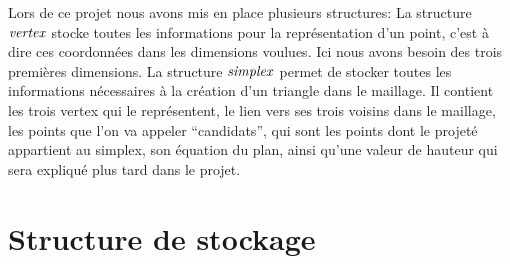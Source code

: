 \documentclass[10pt,a4paper]{report}
\begin{document}
\hspace*{10mm}Lors de ce projet nous avons mis en place plusieurs structures:
\newline\newline
\hspace*{10mm}La structure $\it{vertex}$ stocke toutes les informations pour la représentation d'un point, c'est à dire ces coordonnées dans les dimensions voulues. Ici nous avons besoin des trois premières dimensions.
\newline \newline
\hspace*{10mm}La structure $\it{simplex}$ permet de stocker toutes les informations nécessaires à la création d'un triangle dans le maillage. Il contient les trois vertex qui le représentent, le lien vers ses trois voisins dans le maillage, les points que l'on va appeler “candidats”, qui sont les points dont le projeté appartient au simplex, son équation du plan, ainsi qu'une valeur de hauteur qui sera expliqué plus tard dans le projet.

	\section{Structure de stockage}
		
\end{document}
